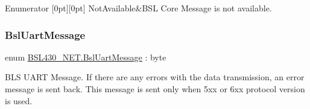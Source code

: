 \begin{DoxyEnumFields}{Enumerator}
[0pt][0pt]{}\mbox{\label{namespace_b_s_l430___n_e_t_ac916153c12b33a95ee1fd35e1a15f17aa534ceac854da4ba59c4dc41b7ab732dc}} 
Not\+Available&B\+SL Core Message is not available. \\
\hline

\end{DoxyEnumFields}
\mbox{\label{namespace_b_s_l430___n_e_t_ae93ff76b832d2a9a0c3d67665e2f25ac}} 
\subsubsection{\texorpdfstring{BslUartMessage}{BslUartMessage}}
{\footnotesize\ttfamily enum \mbox{\hyperlink{namespace_b_s_l430___n_e_t_ae93ff76b832d2a9a0c3d67665e2f25ac}{B\+S\+L430\+\_\+\+N\+E\+T.\+Bsl\+Uart\+Message}} \+: byte\hspace{0.3cm}{\ttfamily [strong]}}



B\+LS U\+A\+RT Message. If there are any errors with the data transmission, an error message is sent back. This message is sent only when 5xx or 6xx protocol version is used. 

